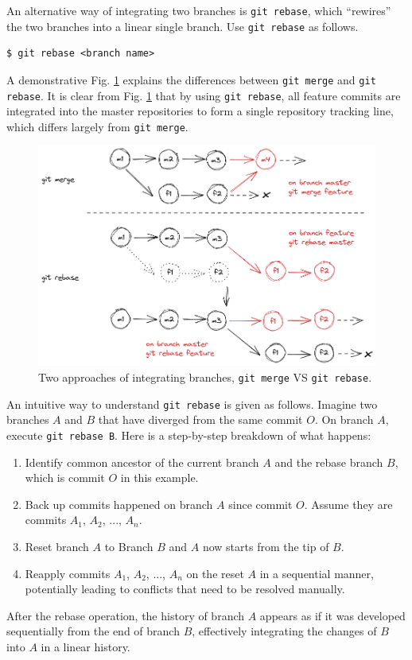 An alternative way of integrating two branches is \verb|git rebase|, which ``rewires'' the two branches into a linear single branch. Use \verb|git rebase| as follows.
\begin{lstlisting}
$ git rebase <branch name>
\end{lstlisting}
A demonstrative Fig. \ref{ch:sma:fig:gitrebase} explains the differences between \verb|git merge| and \verb|git rebase|. It is clear from Fig. \ref{ch:sma:fig:gitrebase} that by using \verb|git rebase|, all feature commits are integrated into the master repositories to form a single repository tracking line, which differs largely from \verb|git merge|.
\begin{figure}[htbp]
	\centering
	\includegraphics[width=350pt]{chapters/part-2/figures/gitrebase.png}
	\caption{Two approaches of integrating branches, \texttt{git merge} VS \texttt{git rebase}.} \label{ch:sma:fig:gitrebase}
\end{figure}

An intuitive way to understand \verb|git rebase| is given as follows. Imagine two branches $A$ and $B$ that have diverged from the same commit $O$. On branch $A$, execute \verb|git rebase B|. Here is a step-by-step breakdown of what happens:
\begin{enumerate}
	\item Identify common ancestor of the current branch $A$ and the rebase branch $B$, which is commit $O$ in this example.
	\item Back up commits happened on branch $A$ since commit $O$. Assume they are commits $A_1$, $A_2$, ..., $A_n$.
	\item Reset branch $A$ to Branch $B$ and $A$ now starts from the tip of $B$.
	\item Reapply commits $A_1$, $A_2$, ..., $A_n$ on the reset $A$ in a sequential manner, potentially leading to conflicts that need to be resolved manually.
\end{enumerate}
After the rebase operation, the history of branch $A$ appears as if it was developed sequentially from the end of branch $B$, effectively integrating the changes of $B$ into $A$ in a linear history.

